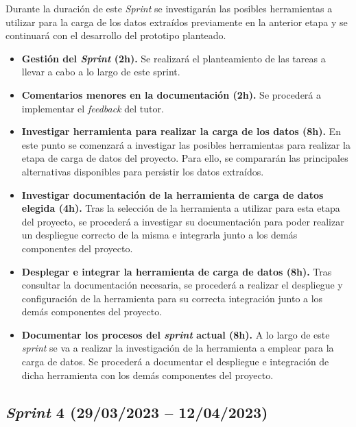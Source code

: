 Durante la duración de este \textit{Sprint} se investigarán las posibles herramientas a utilizar para la carga de los datos extraídos previamente en la anterior etapa y se continuará con el desarrollo del prototipo planteado.

\begin{itemize}

    \item \textbf{Gestión del \textit{Sprint} (2h).} Se realizará el planteamiento de las tareas a llevar a cabo a lo largo de este sprint.

    \item \textbf{Comentarios menores en la documentación (2h).} Se procederá a implementar el \textit{feedback} del tutor.

    \item \textbf{Investigar herramienta para realizar la carga de los datos (8h).} En este punto se comenzará a investigar las posibles herramientas para realizar la etapa de carga de datos del proyecto. Para ello, se compararán las principales alternativas disponibles para persistir los datos extraídos.

    \item \textbf{Investigar documentación de la herramienta de carga de datos elegida (4h).} Tras la selección de la herramienta a utilizar para esta etapa del proyecto, se procederá a investigar su documentación para poder realizar un despliegue correcto de la misma e integrarla junto a los demás componentes del proyecto.

    \item \textbf{Desplegar e integrar la herramienta de carga de datos (8h).} Tras consultar la documentación necesaria, se procederá a realizar el despliegue y configuración de la herramienta para su correcta integración junto a los demás componentes del proyecto.

    \item \textbf{Documentar los procesos del \textit{sprint} actual (8h).} A lo largo de este \textit{sprint} se va a realizar la investigación de la herramienta a emplear para la carga de datos. Se procederá a documentar el despliegue e integración de dicha herramienta con los demás componentes del proyecto.

\end{itemize}

\subsection{\textit{Sprint} 4 (29/03/2023 -- 12/04/2023)}

